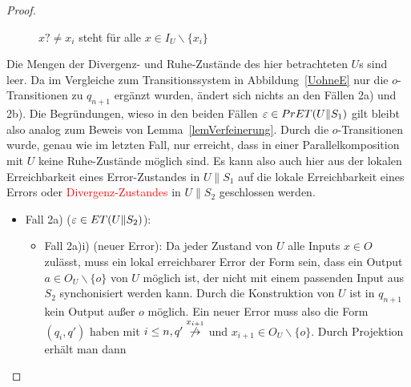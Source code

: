 \begin{proof}
\begin{itemize}
\begin{figure} [h!tbp]
\begin{center}
        \caption{$x?\neq x_i$ steht für alle $x\in I_U\backslash\{x_i\}$}
\label{UohneEmitO}
      \end{center}
      \end{figure}
      Die Mengen der Divergenz- und Ruhe-Zustände des hier betrachteten $U$s
      sind leer. Da im Vergleiche zum Transitionssystem in
      Abbildung~\ref{UohneE} nur die $o$-Transitionen zu $q_{n+1}$ ergänzt
      wurden, ändert sich nichts an den Fällen 2a) und 2b). Die Begründungen,
      wieso in den beiden Fällen $\varepsilon\in PrET{}(U\|S_1)$ gilt bleibt
      also analog zum Beweis von Lemma~\ref{lemVerfeinerung}. Durch die
      $o$-Transitionen wurde, genau wie im letzten Fall, nur erreicht, dass in
      einer Parallelkomposition mit $U$ keine Ruhe-Zustände möglich sind. Es
      kann also auch hier aus der lokalen Erreichbarkeit eines Error-Zustandes
      in $U\|S_1$ auf die lokale Erreichbarkeit eines Errors oder
      \textcolor{red}{Divergenz-Zustandes} in $U\|S_2$ geschlossen werden.
      \begin{itemize}
        \item Fall 2a) ($\varepsilon\in ET{}(U\|S_2)$): 
          \begin{itemize}
            \item Fall 2a)i) (neuer Error): Da jeder Zustand von $U$ alle
              Inputs $x\in O$ zulässt, muss ein lokal erreichbarer Error der
              Form sein, dass ein Output $a\in O_U\backslash\{o\}$ von $U$
              möglich ist, der nicht mit einem passenden Input aus $S_2$
              synchonisiert werden kann. Durch die Konstruktion von $U$ ist in
              $q_{n+1}$ kein Output außer $o$ möglich. Ein neuer Error muss
              also die Form $(q_i,q')$ haben mit $i\leq n, q'
              \overset{x_{i+1}}{\not{\hspace{-0.1cm}\rightarrow}}$ und
              $x_{i+1}\in O_U\backslash\{o\}$. Durch Projektion erhält man dann

\end{itemize}
\end{itemize}
\end{itemize}
\end{proof}
